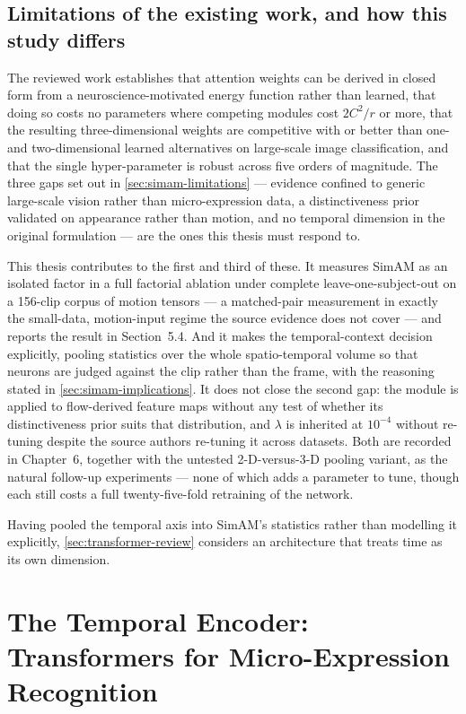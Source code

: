 \subsection{Limitations of the existing work, and how this study differs}
\label{sec:simam-gap}

The reviewed work establishes that attention weights can be derived in closed form from a neuroscience-motivated energy function rather than learned, that doing so costs no parameters where competing modules cost $2C^2/r$ or more, that the resulting three-dimensional weights are competitive with or better than one- and two-dimensional learned alternatives on large-scale image classification, and that the single hyper-parameter is robust across five orders of magnitude. The three gaps set out in \autoref{sec:simam-limitations} --- evidence confined to generic large-scale vision rather than micro-expression data, a distinctiveness prior validated on appearance rather than motion, and no temporal dimension in the original formulation --- are the ones this thesis must respond to.

This thesis contributes to the first and third of these. It measures SimAM as an isolated factor in a full factorial ablation under complete leave-one-subject-out on a 156-clip corpus of motion tensors --- a matched-pair measurement in exactly the small-data, motion-input regime the source evidence does not cover --- and reports the result in Section~5.4. And it makes the temporal-context decision explicitly, pooling statistics over the whole spatio-temporal volume so that neurons are judged against the clip rather than the frame, with the reasoning stated in \autoref{sec:simam-implications}. It does not close the second gap: the module is applied to flow-derived feature maps without any test of whether its distinctiveness prior suits that distribution, and $\lambda$ is inherited at $10^{-4}$ without re-tuning despite the source authors re-tuning it across datasets. Both are recorded in Chapter~6, together with the untested 2-D-versus-3-D pooling variant, as the natural follow-up experiments --- none of which adds a parameter to tune, though each still costs a full twenty-five-fold retraining of the network.

Having pooled the temporal axis into SimAM's statistics rather than modelling it explicitly, \autoref{sec:transformer-review} considers an architecture that treats time as its own dimension.


\section{The Temporal Encoder: Transformers for Micro-Expression Recognition}
\label{sec:transformer-review}

